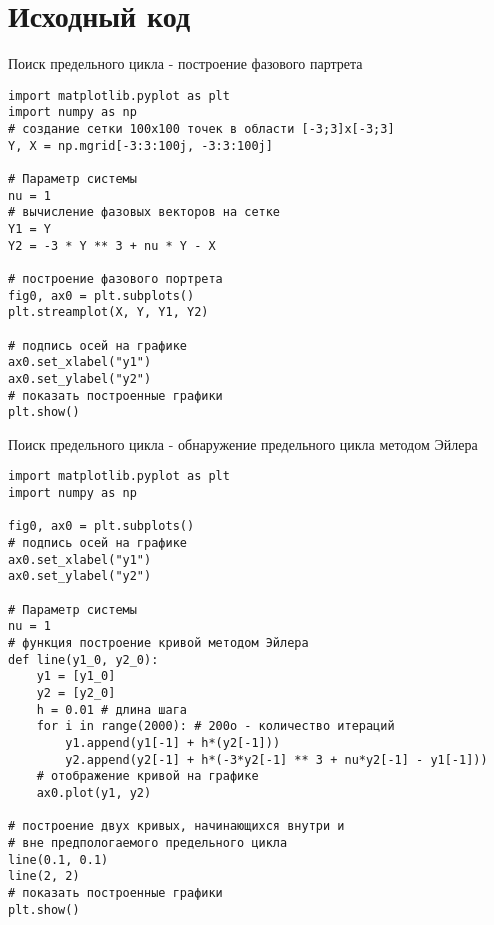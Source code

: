 \chapter{Исходный код}
\label{appendix:src}

\begin{program}
  \caption{Поиск предельного цикла - построение фазового партрета}
  \begin{verbatim}
import matplotlib.pyplot as plt
import numpy as np
# создание сетки 100х100 точек в области [-3;3]x[-3;3]
Y, X = np.mgrid[-3:3:100j, -3:3:100j]

# Параметр системы
nu = 1
# вычисление фазовых векторов на сетке
Y1 = Y
Y2 = -3 * Y ** 3 + nu * Y - X

# построение фазового портрета
fig0, ax0 = plt.subplots()
plt.streamplot(X, Y, Y1, Y2)

# подпись осей на графике
ax0.set_xlabel("y1")
ax0.set_ylabel("y2")
# показать построенные графики
plt.show()
  \end{verbatim}
\end{program}

\begin{program}
  \caption{Поиск предельного цикла - обнаружение предельного цикла методом Эйлера}
  \begin{verbatim}
import matplotlib.pyplot as plt
import numpy as np

fig0, ax0 = plt.subplots()
# подпись осей на графике
ax0.set_xlabel("y1")
ax0.set_ylabel("y2")

# Параметр системы
nu = 1
# функция построение кривой методом Эйлера
def line(y1_0, y2_0):
    y1 = [y1_0]
    y2 = [y2_0]
    h = 0.01 # длина шага
    for i in range(2000): # 200o - количество итераций
        y1.append(y1[-1] + h*(y2[-1]))
        y2.append(y2[-1] + h*(-3*y2[-1] ** 3 + nu*y2[-1] - y1[-1]))
    # отображение кривой на графике
    ax0.plot(y1, y2)

# построение двух кривых, начинающихся внутри и 
# вне предпологаемого предельного цикла
line(0.1, 0.1)
line(2, 2)
# показать построенные графики
plt.show()
  \end{verbatim}
\end{program}
